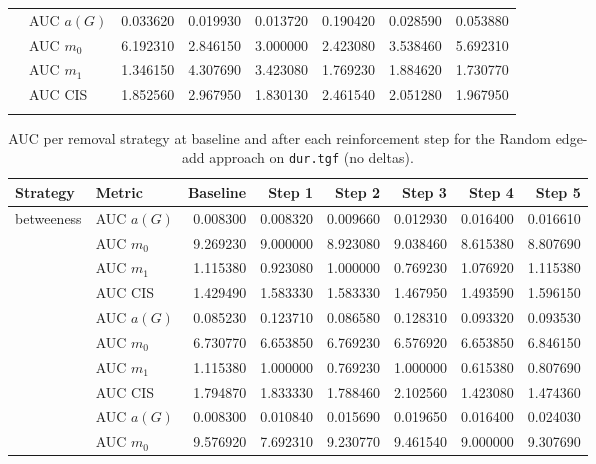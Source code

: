 \begin{table}[htbp]
\begin{tabular}{llrrrrrr}
    \addlinespace
    \multirow{4}{*}{random} & AUC $a(G)$ & 0.033620 & 0.019930 & 0.013720 & 0.190420 & 0.028590 & 0.053880 \\
    & AUC $m_0$ & 6.192310 & 2.846150 & 3.000000 & 2.423080 & 3.538460 & 5.692310 \\
    & AUC $m_1$ & 1.346150 & 4.307690 & 3.423080 & 1.769230 & 1.884620 & 1.730770 \\
    & AUC CIS & 1.852560 & 2.967950 & 1.830130 & 2.461540 & 2.051280 & 1.967950 \\
    \addlinespace
    \bottomrule
  \end{tabular}
\end{table}

\begin{table}[htbp]
  \centering
  \caption{AUC per removal strategy at baseline and after each reinforcement step for the Random edge-add approach on \texttt{dur.tgf} (no deltas).}
  \label{tab:dur-random_add-auc}
  \begin{tabular}{llrrrrrr}
    \toprule
    \textbf{Strategy} & \textbf{Metric} & \textbf{Baseline} & \textbf{Step 1} & \textbf{Step 2} & \textbf{Step 3} & \textbf{Step 4} & \textbf{Step 5} \\
    \midrule
    \multirow{4}{*}{betweeness} & AUC $a(G)$ & 0.008300 & 0.008320 & 0.009660 & 0.012930 & 0.016400 & 0.016610 \\
    & AUC $m_0$ & 9.269230 & 9.000000 & 8.923080 & 9.038460 & 8.615380 & 8.807690 \\
    & AUC $m_1$ & 1.115380 & 0.923080 & 1.000000 & 0.769230 & 1.076920 & 1.115380 \\
    & AUC CIS & 1.429490 & 1.583330 & 1.583330 & 1.467950 & 1.493590 & 1.596150 \\
    \addlinespace
    \multirow{4}{*}{closeness} & AUC $a(G)$ & 0.085230 & 0.123710 & 0.086580 & 0.128310 & 0.093320 & 0.093530 \\
    & AUC $m_0$ & 6.730770 & 6.653850 & 6.769230 & 6.576920 & 6.653850 & 6.846150 \\
    & AUC $m_1$ & 1.115380 & 1.000000 & 0.769230 & 1.000000 & 0.615380 & 0.807690 \\
    & AUC CIS & 1.794870 & 1.833330 & 1.788460 & 2.102560 & 1.423080 & 1.474360 \\
    \addlinespace
    \multirow{4}{*}{core influence} & AUC $a(G)$ & 0.008300 & 0.010840 & 0.015690 & 0.019650 & 0.016400 & 0.024030 \\
    & AUC $m_0$ & 9.576920 & 7.692310 & 9.230770 & 9.461540 & 9.000000 & 9.307690 \\

\end{tabular}
\end{table}
